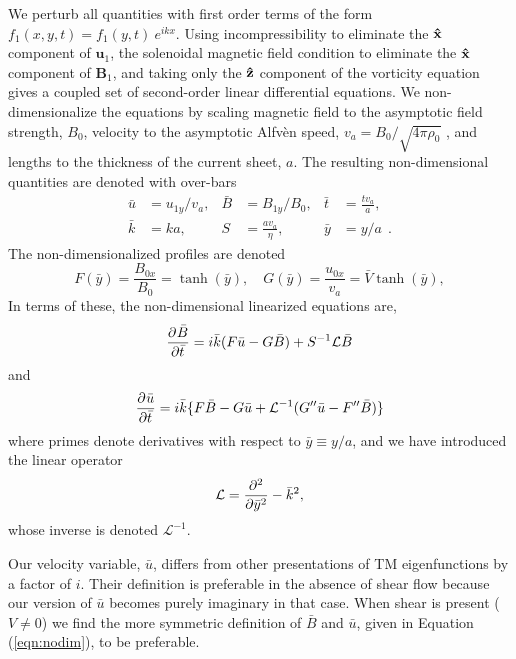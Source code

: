 	We perturb all quantities with first order terms of the form $ f_1(x,y,t) = f_1(y,t) \ e^{ikx}$. Using incompressibility to eliminate the $\bf\hat{x}$ component of $\mathbf{u}_1$, the solenoidal magnetic field condition to eliminate the $\bf\hat{x}$ component of $\mathbf{B}_1$,  and taking only the $\bf\hat{z}$ component of the vorticity equation gives a coupled set of second-order linear differential equations. We non-dimensionalize the equations by scaling magnetic field to the asymptotic field strength, $B_0$, velocity to the asymptotic Alfv\`{e}n speed, $v_a=B_0/\sqrt{4\pi\rho_0}$ , and lengths to the thickness of the current sheet, $a$.  The resulting non-dimensional quantities are denoted with over-bars
		\begin{align}
		\label{eqn:nodim} 
			\bar{u} &= u_{1y}/v_a,  &\bar{B} &= B_{1y}/B_0,  &\bar{t} &= \frac{tv_a}{a},  \\
			\bar{k} &= ka,  & S &= \frac{a v_a}{\eta}, & \bar{y} &= y/a~~.
		\end{align}
	 The non-dimensionalized profiles are denoted
			\begin{equation}
		F(\bar{y}) = \frac{B_{0x}}{B_0} = \tanh(\bar{y}), \quad  G(\bar{y})= \frac{u_{0x}}{v_a}=\bar{V}\tanh(\bar{y}),
		\end{equation}
In terms of these, the non-dimensional linearized equations are,
	\begin{equation}
		\label{eqn:tm_in}
			\frac{\partial^{} { \bar{B}}}{\partial {\bar{t}}^{}} = i\bar{k}(F\bar{u}-G\bar{B}) + S^{-1}\mathcal{L}\bar{B}
		\end{equation}
		and
		\begin{equation}
		\label{eqn:tm_momentum}
			\frac{\partial^{} { \bar{u}}}{\partial {\bar{t}}^{}} = i\bar{k}\lbrace F\bar{B}-G\bar{u} + \mathcal{L}^{-1}(G''\bar{u}-F''\bar{B})  \rbrace
		\end{equation}
where primes denote derivatives with respect to $\bar{y} \equiv y/a$, and we have introduced the linear operator
		\begin{equation}
		\label{eqn:L}
			\mathcal{L} = \frac{\partial^{2} {}}{\partial {\bar{y}}^{2}} - \bar{k}^2,
		\end{equation}
		whose inverse is denoted	$\mathcal{L}^{-1}$. 
		
Our velocity variable, $\bar{u}$, differs from other presentations of TM eigenfunctions \citep{Velli1989,Ofman1991} by a factor of $i$.  Their definition is preferable in the absence of shear flow because our version of $\bar{u}$ becomes purely imaginary in that case.  When shear is present ($V\ne0$) we find the more symmetric definition of $\bar{B}$ and $\bar{u}$, given in Equation (\ref{eqn:nodim}), to be preferable. 
	
